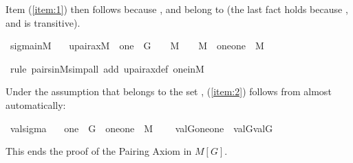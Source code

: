 Item (\ref{item:1}) then follows because \isa{\isasymtau}, \isa{\isasymrho} and
 belong to  (the last fact holds because ,  and
 is transitive).

\begin{isabelle}
\isamarkupfalse%
\ sigma{\isacharunderscore}in{\isacharunderscore}M\ {\isacharcolon}\isanewline
\ \ {\isachardoublequoteopen}upair{\isacharunderscore}ax{\isacharparenleft}{\isacharhash}{\isacharhash}M{\isacharparenright}\ {\isasymLongrightarrow}\ one\ {\isasymin}\ G\ {\isasymLongrightarrow}\ {\isasymtau}\ {\isasymin}\ M\ {\isasymLongrightarrow}\ {\isasymrho}\ {\isasymin}\ M\ {\isasymLongrightarrow}\ {\isacharbraceleft}{\isasymlangle}{\isasymtau}{\isacharcomma}one{\isasymrangle}{\isacharcomma}{\isasymlangle}{\isasymrho}{\isacharcomma}one{\isasymrangle}{\isacharbraceright}\ {\isasymin}\ M{\isachardoublequoteclose}

\isamarkupfalse%
\ {\isacharparenleft}rule\ pairs{\isacharunderscore}in{\isacharunderscore}M{\isacharcomma}simp{\isacharunderscore}all\ add{\isacharcolon}\ upair{\isacharunderscore}ax{\isacharunderscore}def\ one{\isacharunderscore}in{\isacharunderscore}M{\isacharparenright}%
\end{isabelle}

Under the assumption that  belongs to the set ,
(\ref{item:2}) follows from  almost automatically:

\begin{isabelle}
\isamarkupfalse%
\ valsigma\ {\isacharcolon}\isanewline
\ \ {\isachardoublequoteopen}one\ {\isasymin}\ G\ {\isasymLongrightarrow}\ {\isacharbraceleft}{\isasymlangle}{\isasymtau}{\isacharcomma}one{\isasymrangle}{\isacharcomma}{\isasymlangle}{\isasymrho}{\isacharcomma}one{\isasymrangle}{\isacharbraceright}\ {\isasymin}\ M\ {\isasymLongrightarrow}\isanewline
\ \ \ val{\isacharparenleft}G{\isacharcomma}{\isacharbraceleft}{\isasymlangle}{\isasymtau}{\isacharcomma}one{\isasymrangle}{\isacharcomma}{\isasymlangle}{\isasymrho}{\isacharcomma}one{\isasymrangle}{\isacharbraceright}{\isacharparenright}\ {\isacharequal}\ {\isacharbraceleft}val{\isacharparenleft}G{\isacharcomma}{\isasymtau}{\isacharparenright}{\isacharcomma}val{\isacharparenleft}G{\isacharcomma}{\isasymrho}{\isacharparenright}{\isacharbraceright}{\isachardoublequoteclose}
\end{isabelle}

This ends the proof of the Pairing Axiom in $M[G]$.

